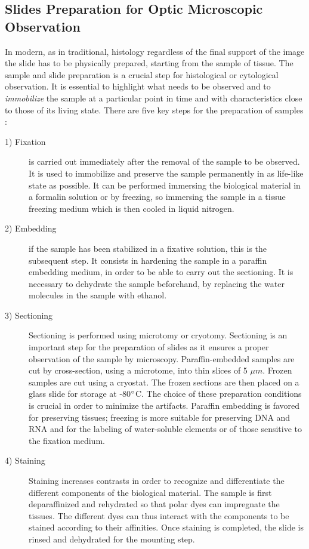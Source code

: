 \subsection{Slides Preparation for Optic Microscopic Observation} \label{ssec:samp_prep}
    In modern, as in traditional, histology regardless of the final support of the image the slide has to be physically prepared, starting from the sample of tissue. The sample and slide preparation is a crucial step for histological or cytological observation. It is essential to highlight what needs to be observed and to \textit{immobilize} the sample at a particular point in time and with characteristics close to those of its living state. There are five key steps for the preparation of samples \cite{Alturkistani2015}:
    \begin{description}
        \item [1) Fixation] is carried out immediately after the removal of the sample to be observed. It is used to immobilize and preserve the sample permanently in as life-like state as possible. It can be performed immersing the biological material in a formalin solution or by freezing, so immersing the sample in a tissue freezing medium which is then cooled in liquid nitrogen.

        \item [2) Embedding] if the sample has been stabilized in a fixative solution, this is the subsequent step. It consists in hardening the sample in a paraffin embedding medium, in order to be able to carry out the sectioning. It is necessary to dehydrate the sample beforehand, by replacing the water molecules in the sample with ethanol.

        \item [3) Sectioning] Sectioning is performed using microtomy or cryotomy. Sectioning is an important step for the preparation of slides as it ensures a proper observation of the sample by microscopy. Paraffin-embedded samples are cut by cross-section, using a microtome, into thin slices of 5 $\mu m$. Frozen samples are cut using a cryostat. The frozen sections are then placed on a glass slide for storage at -80$\degree$C. The choice of these preparation conditions is crucial in order to minimize the artifacts. Paraffin embedding is favored for preserving tissues; freezing is more suitable for preserving DNA and RNA and for the labeling of water-soluble elements or of those sensitive to the fixation medium.

        \item [4) Staining] Staining increases contrasts in order to recognize and differentiate the different components of the biological material. The sample is first deparaffinized and rehydrated so that polar dyes can impregnate the tissues. The different dyes can thus interact with the components to be stained according to their affinities. Once staining is completed, the slide is rinsed and dehydrated for the mounting step.

    \end{description}

